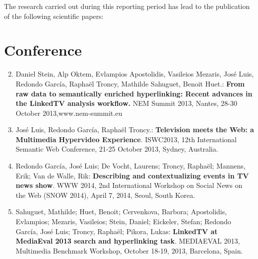 \documentclass[a4paper,11pt]{report}
\begin{document}
The research carried out during this reporting period has lead to the publication of the following scientific papers:

\section*{Conference}
\begin{enumerate}
\setcounter{enumi}{1}

\item Daniel Stein, Alp Oktem, Evlampios Apostolidis, Vasileios Mezaris, Jos\'e Luis, Redondo Garc\'ia, Rapha\"el Troncy, Mathilde Sahuguet, Benoit Huet.:
\textbf{From raw data to semantically enriched hyperlinking: Recent advances in the LinkedTV analysis workflow.}
NEM Summit 2013, Nantes, 28-30 October 2013,www.nem-summit.eu

\item Jos\'e Luis, Redondo Garc\'ia, Rapha\"el Troncy.:
\textbf{Television meets the Web: a Multimedia Hypervideo Experience}.
ISWC2013, 12th International Semantic Web Conference, 21-25 October 2013, Sydney, Australia.

\item Redondo Garc\'ia, Jos\'e Luis; De Vocht, Laurens; Troncy, Rapha\"el; Mannens, Erik; Van de Walle, Rik:
\textbf{Describing and contextualizing events in TV news show}.
WWW 2014, 2nd International Workshop on Social News on the Web (SNOW 2014), April 7, 2014, Seoul, South Korea.

\item Sahuguet, Mathilde; Huet, Benoit; Cervenkova, Barbora; Apostolidis, Evlampios; Mezaris, Vasileios; Stein, Daniel; Eickeler, Stefan; Redondo Garc\'ia, Jos\'e Luis; Troncy, Rapha\"el; Pikora, Lukas:
\textbf{LinkedTV at MediaEval 2013 search and hyperlinking task}.
MEDIAEVAL 2013, Multimedia Benchmark Workshop, October 18-19, 2013, Barcelona, Spain.

\end{enumerate}
\end{document}

